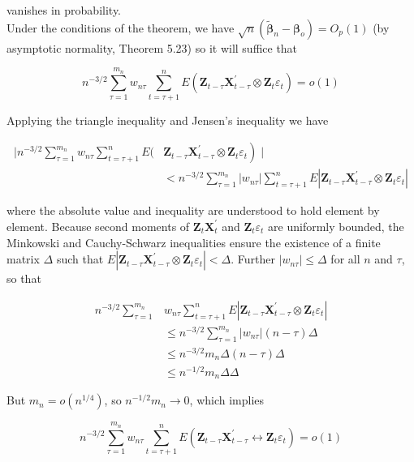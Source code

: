 \documentclass[10pt]{article}
\begin{document}
vanishes in probability.\\
Under the conditions of the theorem, we have $\sqrt{n}\left(\tilde{\boldsymbol{\beta}}_{n}-\boldsymbol{\beta}_{o}\right)=O_{p}(1)$ (by asymptotic normality, Theorem 5.23) so it will suffice that

$$
n^{-3 / 2} \sum_{\tau=1}^{m_{n}} w_{n \tau} \sum_{t=\tau+1}^{n} E\left(\mathbf{Z}_{t-\tau} \mathbf{X}_{t-\tau}^{\prime} \otimes \mathbf{Z}_{t} \varepsilon_{t}\right)=o(1)
$$

Applying the triangle inequality and Jensen's inequality we have

$$
\begin{aligned}
\mid n^{-3 / 2} \sum_{\tau=1}^{m_{n}} w_{n \tau} \sum_{t=\tau+1}^{n} E( & \left.\mathbf{Z}_{t-\tau} \mathbf{X}_{t-\tau}^{\prime} \otimes \mathbf{Z}_{t} \varepsilon_{t}\right) \mid \\
& <n^{-3 / 2} \sum_{\tau=1}^{m_{n}}\left|w_{n \tau}\right| \sum_{t=\tau+1}^{n} E\left|\mathbf{Z}_{t-\tau} \mathbf{X}_{t-\tau}^{\prime} \otimes \mathbf{Z}_{t} \varepsilon_{t}\right|
\end{aligned}
$$

where the absolute value and inequality are understood to hold element by element. Because second moments of $\mathbf{Z}_{t} \mathbf{X}_{t}^{\prime}$ and $\mathbf{Z}_{t} \varepsilon_{t}$ are uniformly bounded, the Minkowski and Cauchy-Schwarz inequalities ensure the existence of a finite matrix $\Delta$ such that $E\left|\mathbf{Z}_{t-\tau} \mathbf{X}_{t-\tau}^{\prime} \otimes \mathbf{Z}_{t} \varepsilon_{t}\right|<\Delta$. Further $\left|w_{n \tau}\right| \leq \Delta$ for all $n$ and $\tau$, so that

$$
\begin{aligned}
n^{-3 / 2} \sum_{\tau=1}^{m_{n}} & w_{n \tau} \sum_{t=\tau+1}^{n} E\left|\mathbf{Z}_{t-\tau} \mathbf{X}_{t-\tau}^{\prime} \otimes \mathbf{Z}_{t} \varepsilon_{t}\right| \\
& \leq n^{-3 / 2} \sum_{\tau=1}^{m_{n}}\left|w_{n \tau}\right|(n-\tau) \Delta \\
& \leq n^{-3 / 2} m_{n} \Delta(n-\tau) \Delta \\
& \leq n^{-1 / 2} m_{n} \Delta \Delta
\end{aligned}
$$

But $m_{n}=o\left(n^{1 / 4}\right)$, so $n^{-1 / 2} m_{n} \rightarrow 0$, which implies

$$
n^{-3 / 2} \sum_{\tau=1}^{m_{n}} w_{n \tau} \sum_{t=\tau+1}^{n} E\left(\mathbf{Z}_{t-\tau} \mathbf{X}_{t-\tau}^{\prime} \leftrightarrow \mathbf{Z}_{t} \varepsilon_{t}\right)=o(1)
$$
\end{document}
